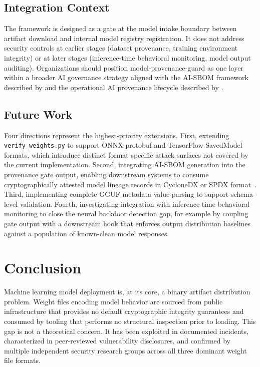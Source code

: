 \documentclass[preprint,12pt,twocolumn]{elsarticle}
\begin{document}
\subsection{Integration Context}

The framework is designed as a gate at the model intake boundary between
artifact download and internal model registry registration. It does not
address security controls at earlier stages (dataset provenance, training
environment integrity) or at later stages (inference-time behavioral
monitoring, model output auditing). Organizations should position
model-provenance-guard as one layer within a broader AI governance
strategy aligned with the AI-SBOM framework described by
\citet{gentyala2026aisbom} and the operational AI provenance lifecycle
described by \citet{frontiers2026aibom}.

\subsection{Future Work}

Four directions represent the highest-priority extensions. First, extending
\texttt{verify\_weights.py} to support ONNX protobuf and TensorFlow
SavedModel formats, which introduce distinct format-specific attack surfaces
not covered by the current implementation. Second, integrating AI-SBOM
generation into the provenance gate output, enabling downstream systems to
consume cryptographically attested model lineage records in CycloneDX or
SPDX format~\citep{gentyala2026aisbom}. Third, implementing complete GGUF
metadata value parsing to support schema-level validation. Fourth,
investigating integration with inference-time behavioral monitoring to close
the neural backdoor detection gap, for example by coupling gate output with
a downstream hook that enforces output distribution baselines against a
population of known-clean model responses.

\section{Conclusion}
\label{sec:conclusion}

Machine learning model deployment is, at its core, a binary artifact
distribution problem. Weight files encoding model behavior are sourced from
public infrastructure that provides no default cryptographic integrity
guarantees and consumed by tooling that performs no structural inspection
prior to loading. This gap is not a theoretical concern. It has been
exploited in documented incidents, characterized in peer-reviewed
vulnerability disclosures, and confirmed by multiple independent security
research groups across all three dominant weight file formats.
\end{document}
